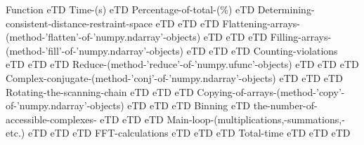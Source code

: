 \bTABLE
\bTR
\bTD Function eTD \bTD Time-(s) eTD \bTD Percentage-of-total-(\%) eTD 
\eTR
\bTR
\bTD Determining-consistent-distance-restraint-space eTD  eTD  eTD 
\eTR
\bTR
\bTD Flattening-arrays-(method-'flatten'-of-'numpy.ndarray'-objects) eTD  eTD  eTD 
\eTR
\bTR
\bTD Filling-arrays-(method-'fill'-of-'numpy.ndarray'-objects) eTD  eTD  eTD 
\eTR
\bTR
\bTD Counting-violations eTD  eTD  eTD 
\eTR
\bTR
\bTD Reduce-(method-'reduce'-of-'numpy.ufunc'-objects) eTD  eTD  eTD 
\eTR
\bTR
\bTD Complex-conjugate-(method-'conj'-of-'numpy.ndarray'-objects) eTD  eTD  eTD 
\eTR
\bTR
\bTD Rotating-the-scanning-chain eTD  eTD  eTD 
\eTR
\bTR
\bTD Copying-of-arrays-(method-'copy'-of-'numpy.ndarray'-objects) eTD  eTD  eTD 
\eTR
\bTR
\bTD Binning eTD \bTD the-number-of-accessible-complexes- eTD  eTD  eTD 
\eTR
\bTR
\bTD Main-loop-(multiplications,-summations,-etc.) eTD  eTD  eTD 
\eTR
\bTR
\bTD FFT-calculations eTD  eTD  eTD 
\eTR
\bTR
\bTD Total-time eTD  eTD  eTD 
\eTR
\bTR

\eTR
\eTABLE

